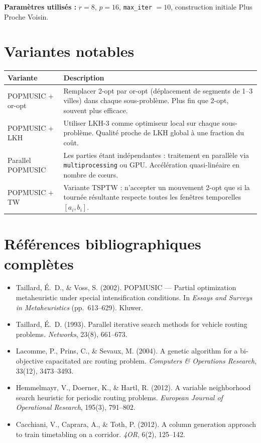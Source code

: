 \documentclass[11pt,a4paper]{article}
\begin{document}
\textbf{Paramètres utilisés :} $r = 8$, $p = 16$, \texttt{max\_iter} $= 10$,
construction initiale Plus Proche Voisin.

\section{Variantes notables}

\begin{center}
\begin{tabularx}{\textwidth}{lX}
  \toprule
  Variante & Description \\
  \midrule
  POPMUSIC + or-opt &
    Remplacer 2-opt par or-opt (déplacement de segments de 1--3 villes) dans
    chaque sous-problème. Plus fin que 2-opt, souvent plus efficace. \\
  POPMUSIC + LKH &
    Utiliser LKH-3 comme optimiseur local sur chaque sous-problème. Qualité
    proche de LKH global à une fraction du coût. \\
  Parallel POPMUSIC &
    Les parties étant indépendantes : traitement en parallèle via
    \texttt{multiprocessing} ou GPU. Accélération quasi-linéaire en nombre de
    cœurs. \\
  POPMUSIC + TW &
    Variante TSPTW : n'accepter un mouvement 2-opt que si la tournée résultante
    respecte toutes les fenêtres temporelles $[a_i, b_i]$. \\
  \bottomrule
\end{tabularx}
\end{center}

\section*{Références bibliographiques complètes}

\begin{itemize}
  \item Taillard, É.~D., \& Voss, S. (2002). POPMUSIC --- Partial optimization
    metaheuristic under special intensification conditions. In \textit{Essays
    and Surveys in Metaheuristics} (pp.~613--629). Kluwer.
  \item Taillard, É.~D. (1993). Parallel iterative search methods for vehicle
    routing problems. \textit{Networks}, 23(8), 661--673.
  \item Lacomme, P., Prins, C., \& Sevaux, M. (2004). A genetic algorithm for
    a bi-objective capacitated arc routing problem.
    \textit{Computers \& Operations Research}, 33(12), 3473--3493.
  \item Hemmelmayr, V., Doerner, K., \& Hartl, R. (2012). A variable
    neighborhood search heuristic for periodic routing problems.
    \textit{European Journal of Operational Research}, 195(3), 791--802.
  \item Cacchiani, V., Caprara, A., \& Toth, P. (2012). A column generation
    approach to train timetabling on a corridor.
    \textit{4OR}, 6(2), 125--142.
\end{itemize}
\end{document}
